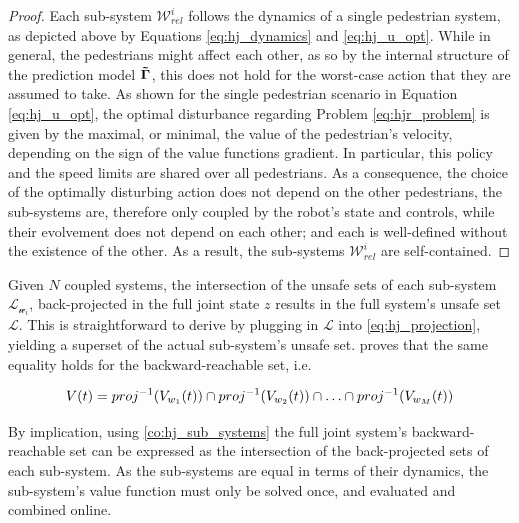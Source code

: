 \begin{proof}
Each sub-system $\mathcal{W}_{rel}^i$ follows the dynamics of a single pedestrian system, as depicted above by Equations \ref{eq:hj_dynamics} and \ref{eq:hj_u_opt}. While in general, the pedestrians might affect each other, as so by the internal structure of the prediction model $\distmodel[]$, this does not hold for the worst-case action that they are assumed to take. As shown for the single pedestrian scenario in Equation \ref{eq:hj_u_opt}, the optimal disturbance regarding Problem \ref{eq:hjr_problem} is given by the maximal, or minimal, the value of the pedestrian's velocity, depending on the sign of the value functions gradient. In particular, this policy and the speed limits are shared over all pedestrians. As a consequence, the choice of the optimally disturbing action does not depend on the other pedestrians, the sub-systems are, therefore only coupled by the robot's state and controls, while their evolvement does not depend on each other; and each is well-defined without the existence of the other. As a result, the sub-systems $\mathcal{W}_{rel}^i$ are self-contained.
\end{proof}

Given $N$ coupled systems, the intersection of the unsafe sets of each sub-system $\mathcal{L}_{\mathcal{w}_i}$, back-projected in the full joint state $z$ results in the full system's unsafe set $\mathcal{L}$. This is straightforward to derive by plugging in $\mathcal{L}$ into \ref{eq:hj_projection}, yielding a superset of the actual sub-system's unsafe set. \cite{Chen2016a} proves that the same equality holds for the backward-reachable set, i.e.

\begin{equation}
V(t) = proj^{-1}(V_{w_1}(t)) \cap proj^{-1}(V_{w_2}(t)) \cap \hdots \cap proj^{-1}(V_{w_M}(t))
\end{equation}

By implication, using \ref{co:hj_sub_systems} the full joint system's backward-reachable set can be expressed as the intersection of the back-projected sets of each sub-system. As the sub-systems are equal in terms of their dynamics, the sub-system's value function must only be solved once, and evaluated and combined online.
